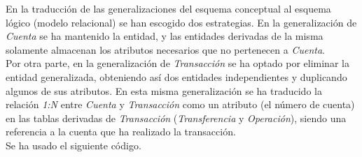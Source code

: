 \documentclass{article}
\begin{document}
En la traducción de las generalizaciones del esquema conceptual al esquema lógico (modelo relacional) se han escogido dos estrategias. En la generalización de \emph{Cuenta} se ha mantenido la entidad, y las entidades derivadas de la misma solamente almacenan los atributos necesarios que no pertenecen a \emph{Cuenta}.\\
Por otra parte, en la generalización de \emph{Transacción} se ha optado por eliminar la entidad generalizada, obteniendo así dos entidades independientes y duplicando algunos de sus atributos. En esta misma generalización se ha traducido la relación \emph{1:N} entre \emph{Cuenta} y \emph{Transacción} como un atributo (el número de cuenta) en las tablas derivadas de \emph{Transacción} (\emph{Transferencia} y \emph{Operación}), siendo una referencia a la cuenta que ha realizado la transacción.\\
Se ha usado el siguiente código.\\
\newpage
\end{document}

